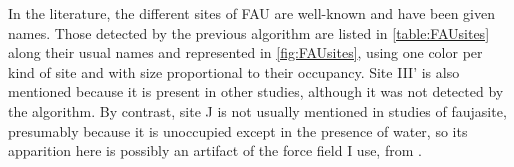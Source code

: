 \documentclass[main.tex]{subfiles}
\begin{document}

In the literature, the different sites of FAU are well-known and have been given names. Those detected by the previous algorithm are listed in \cref{table:FAUsites} along their usual names and represented in \cref{fig:FAUsites}, using one color per kind of site and with size proportional to their occupancy. Site III' is also mentioned because it is present in other studies, although it was not detected by the algorithm. By contrast, site J is not usually mentioned in studies of faujasite, presumably because it is unoccupied except in the presence of water\autocite{DiLellaFF,WaterFAU}, so its apparition here is possibly an artifact of the force field I use, from \textcite{BoulfelfelSholl2021}.
\end{document}
